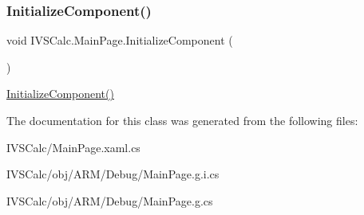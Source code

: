 \subsubsection{\texorpdfstring{Initialize\+Component()}{InitializeComponent()}\hspace{0.1cm}{\footnotesize\ttfamily [5/5]}}
{\footnotesize\ttfamily void I\+V\+S\+Calc.\+Main\+Page.\+Initialize\+Component (\begin{DoxyParamCaption}{ }\end{DoxyParamCaption})}



\hyperlink{class_i_v_s_calc_1_1_main_page_a82228985b36d2c45b809d7b2ba489aef}{Initialize\+Component()} 



The documentation for this class was generated from the following files\+:\begin{DoxyCompactItemize}
\item 
I\+V\+S\+Calc/Main\+Page.\+xaml.\+cs\item 
I\+V\+S\+Calc/obj/\+A\+R\+M/\+Debug/Main\+Page.\+g.\+i.\+cs\item 
I\+V\+S\+Calc/obj/\+A\+R\+M/\+Debug/Main\+Page.\+g.\+cs\end{DoxyCompactItemize}
